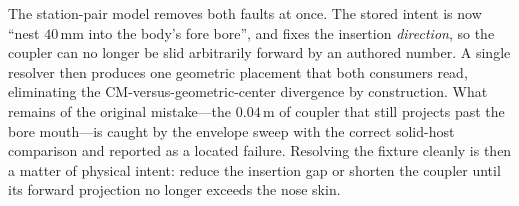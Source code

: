 \begin{keyinsight}
The station-pair model removes both faults at once. The stored intent is now ``nest $40\,$mm
into the body's fore bore'', and  fixes the insertion \emph{direction}, so
the coupler can no longer be slid arbitrarily forward by an authored number. A single
resolver then produces one geometric placement that both consumers read, eliminating the
CM-versus-geometric-center divergence by construction. What remains of the original
mistake---the $0.04\,$m of coupler that still projects past the bore mouth---is caught by the
envelope sweep with the correct solid-host comparison and reported as a located failure.
Resolving the fixture cleanly is then a matter of physical intent: reduce the insertion gap
or shorten the coupler until its forward projection no longer exceeds the nose skin.
\end{keyinsight}
